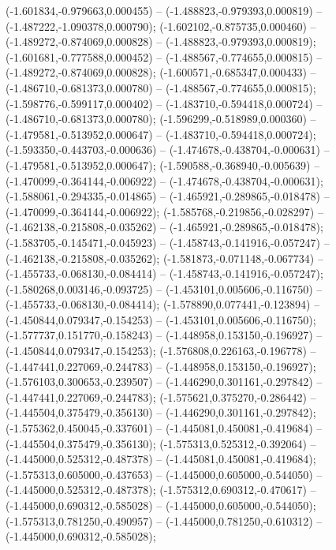  (-1.601834,-0.979663,0.000455) -- (-1.488823,-0.979393,0.000819) -- (-1.487222,-1.090378,0.000790);
 (-1.602102,-0.875735,0.000460) -- (-1.489272,-0.874069,0.000828) -- (-1.488823,-0.979393,0.000819);
 (-1.601681,-0.777588,0.000452) -- (-1.488567,-0.774655,0.000815) -- (-1.489272,-0.874069,0.000828);
 (-1.600571,-0.685347,0.000433) -- (-1.486710,-0.681373,0.000780) -- (-1.488567,-0.774655,0.000815);
 (-1.598776,-0.599117,0.000402) -- (-1.483710,-0.594418,0.000724) -- (-1.486710,-0.681373,0.000780);
 (-1.596299,-0.518989,0.000360) -- (-1.479581,-0.513952,0.000647) -- (-1.483710,-0.594418,0.000724);
 (-1.593350,-0.443703,-0.000636) -- (-1.474678,-0.438704,-0.000631) -- (-1.479581,-0.513952,0.000647);
 (-1.590588,-0.368940,-0.005639) -- (-1.470099,-0.364144,-0.006922) -- (-1.474678,-0.438704,-0.000631);
 (-1.588061,-0.294335,-0.014865) -- (-1.465921,-0.289865,-0.018478) -- (-1.470099,-0.364144,-0.006922);
 (-1.585768,-0.219856,-0.028297) -- (-1.462138,-0.215808,-0.035262) -- (-1.465921,-0.289865,-0.018478);
 (-1.583705,-0.145471,-0.045923) -- (-1.458743,-0.141916,-0.057247) -- (-1.462138,-0.215808,-0.035262);
 (-1.581873,-0.071148,-0.067734) -- (-1.455733,-0.068130,-0.084414) -- (-1.458743,-0.141916,-0.057247);
 (-1.580268,0.003146,-0.093725) -- (-1.453101,0.005606,-0.116750) -- (-1.455733,-0.068130,-0.084414);
 (-1.578890,0.077441,-0.123894) -- (-1.450844,0.079347,-0.154253) -- (-1.453101,0.005606,-0.116750);
 (-1.577737,0.151770,-0.158243) -- (-1.448958,0.153150,-0.196927) -- (-1.450844,0.079347,-0.154253);
 (-1.576808,0.226163,-0.196778) -- (-1.447441,0.227069,-0.244783) -- (-1.448958,0.153150,-0.196927);
 (-1.576103,0.300653,-0.239507) -- (-1.446290,0.301161,-0.297842) -- (-1.447441,0.227069,-0.244783);
 (-1.575621,0.375270,-0.286442) -- (-1.445504,0.375479,-0.356130) -- (-1.446290,0.301161,-0.297842);
 (-1.575362,0.450045,-0.337601) -- (-1.445081,0.450081,-0.419684) -- (-1.445504,0.375479,-0.356130);
 (-1.575313,0.525312,-0.392064) -- (-1.445000,0.525312,-0.487378) -- (-1.445081,0.450081,-0.419684);
 (-1.575313,0.605000,-0.437653) -- (-1.445000,0.605000,-0.544050) -- (-1.445000,0.525312,-0.487378);
 (-1.575312,0.690312,-0.470617) -- (-1.445000,0.690312,-0.585028) -- (-1.445000,0.605000,-0.544050);
 (-1.575313,0.781250,-0.490957) -- (-1.445000,0.781250,-0.610312) -- (-1.445000,0.690312,-0.585028);
